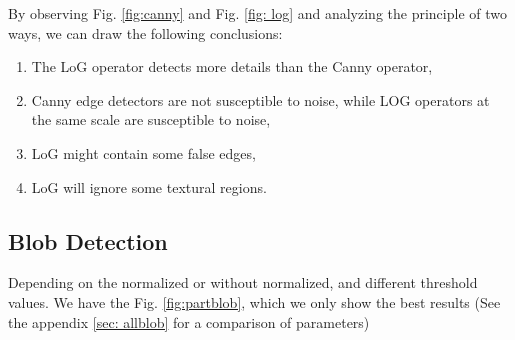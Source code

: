 \documentclass[final]{cvpr}
\begin{document}
By observing Fig. \ref{fig:canny} and Fig. \ref{fig: log} and analyzing the principle of two ways, we can draw the following conclusions:

\begin{enumerate}
\item The LoG operator detects more details than the Canny operator,
\item Canny edge detectors are not susceptible to noise, while LOG operators at the same scale are susceptible to noise,
\item LoG might contain some false edges,
\item LoG will ignore some textural regions.
\end{enumerate}

\subsection{Blob Detection}
Depending on the normalized or without normalized, and different threshold values. We have the Fig. \ref{fig:partblob}, which we only show the best results (See the appendix \ref{sec: allblob} for a comparison of parameters)
\end{document}
